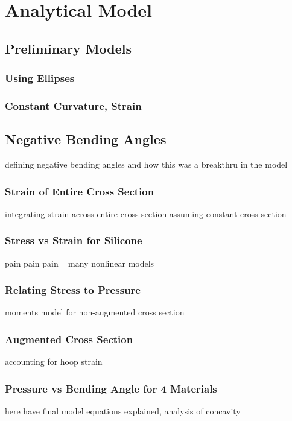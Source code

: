 \chapter{Analytical Model}
\section{Preliminary Models}
\subsection{Using Ellipses}
\subsection{Constant Curvature, Strain}

\section{Negative Bending Angles}
defining negative bending angles and how this was a breakthru in the model
\subsection{Strain of Entire Cross Section}
integrating strain across entire cross section assuming constant cross section
\subsection{Stress vs Strain for Silicone}
pain pain pain ~ many nonlinear models 
\subsection{Relating Stress to Pressure}
moments model for non-augmented cross section
\subsection{Augmented Cross Section}
accounting for hoop strain ~~ 
\subsection{Pressure vs Bending Angle for 4 Materials}
here have final model equations explained, analysis of concavity
